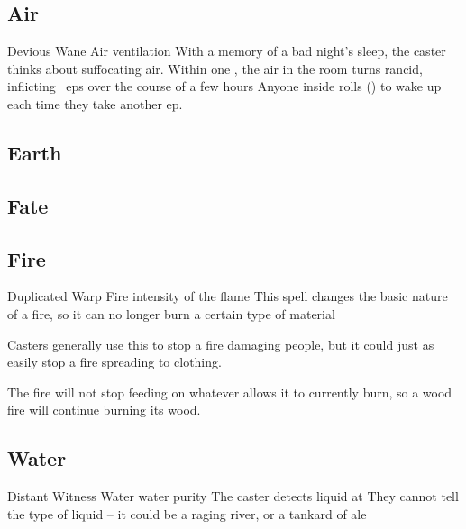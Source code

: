 \begin{multicols}{2}

\subsection{Air}

  {Devious}%
  {Wane}%
  {Air}%
  {ventilation}%
  {With a memory of a bad night's sleep, the caster thinks about suffocating air.
  Within one \showOnset, the air in the room turns rancid, inflicting ~\glspl{ep} over the course of a few hours}%
  {Anyone inside rolls  (\tn[10]) to wake up each time they take another \gls{ep}.}



\subsection{Earth}


\subsection{Fate}


\subsection{Fire}


  {Duplicated}%
  {Warp}%
  {Fire}%
  {intensity of the flame}%
  {This spell changes the basic nature of a fire, so it can no longer burn a certain type of material}%
  {Casters generally use this to stop a fire damaging people, but it could just as easily stop a fire spreading to clothing.

    The fire will not stop feeding on whatever allows it to currently burn, so a wood fire will continue burning its wood.}

\subsection{Water}


  {Distant}%
  {Witness}%
  {Water}%
  {water purity}%
  {The caster detects liquid at \spellRange}%
  {They cannot tell the type of liquid -- it could be a raging river, or a tankard of ale}


\end{multicols}

